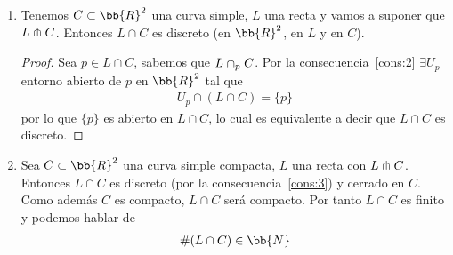 \begin{observacion}
\begin{enumerate}
        \item\label{cons:3} Tenemos $C\subset \bb{R}^2$ una curva simple, $L$ una recta y vamos a suponer que $L \pitchfork C$. Entonces $L\cap C$ es discreto (en $\bb{R}^2$, en $L$ y en $C$).
        \begin{proof}
            Sea $p\in L\cap C$, sabemos que $L\pitchfork_p C$. Por la consecuencia~\ref{cons:2} $\exists U_p$ entorno abierto de $p$ en $\bb{R}^2$ tal que 
            \begin{gather*}
                U_p \cap (L\cap C) = \{p\}
            \end{gather*}
            por lo que $\{p\}$ es abierto en $L\cap C$, lo cual es equivalente a decir que $L\cap C$ es discreto.
        \end{proof}
        \item\label{cons:4} Sea $C\subset \bb{R}^2$ una curva simple compacta, $L$ una recta con $L\pitchfork C$. Entonces $L\cap C$ es discreto (por la consecuencia~\ref{cons:3}) y cerrado en $C$. Como además $C$ es compacto, $L\cap C$ será compacto. Por tanto $L\cap C$ es finito y podemos hablar de
        \begin{gather*}
            \# (L\cap C)\in \bb{N}
        \end{gather*}
    \end{enumerate}
\end{observacion}

